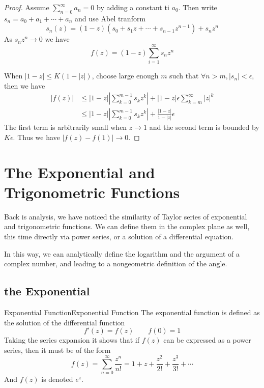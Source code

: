 \documentclass[../main.tex]{subfiles}
\begin{document}
\begin{proof}
Assume $\sum_{n=0}^{\infty } a_n = 0$ by adding a constant ti $a_0$. Then write $s_n = a_0+a_1+\cdots +a_n$ and use Abel tranform
\begin{equation*}
	s_n(z) = (1-z)(s_0+s_1z+\cdots + s_{n-1}z^{n-1}) + s_nz^n
\end{equation*}
As $s_nz^n \rightarrow 0$ we have
\begin{equation*}
f(z) = (1-z) \sum_{i=1}^{\infty } s_nz^n
\end{equation*}

When $\left|1-z\right| \leq K(1-\left|z\right|)$, choose large enough $m$ such that $\forall n>m,\left|s_n\right|<\epsilon$, then we have
\begin{equation*}
\begin{aligned}
	\left|f(z)\right| &\leq \left|1-z\right| \left|\sum_{k=0}^{m-1} s_kz^k\right| + \left|1-z\right| \epsilon \sum_{k=m}^{\infty } \left|z\right|^k\\
			  &\leq \left|1-z\right| \left|\sum_{k=0}^{m-1} s_kz^k\right| + \frac{\left|1-z\right|}{1-\left|z\right|} \epsilon
\end{aligned}
\end{equation*}
The first term is arbitrarily small when $z \rightarrow 1$ and the second term is bounded by $K\epsilon$. Thus we have $\left|f(z)-f(1)\right| \rightarrow 0$.
\end{proof}


\section{The Exponential and Trigonometric Functions}

Back is analysis, we have noticed the similarity of Taylor series of exponential and trigonometric functions. We can define them in the complex plane as well, this time directly via power series, or a solution of a differential equation.

In this way, we can analytically define the logarithm and the argument of a complex number, and leading to a nongeometric definition of the angle.

\subsection{the Exponential}
\begin{definition}{Exponential Function}{Exponential Function}
The exponential function is defined as the solution of the differential function
\begin{equation}
f'(z) = f(z) \qquad f(0) = 1
\end{equation}
Taking the series expansion it shows that if $f(z)$ can be expressed as a power series, then it must be of the form
\begin{equation}
	f(z) = \sum_{n=0}^{\infty } \frac{z^n}{n!} = 1 + z + \frac{z^2}{2!} + \frac{z^3}{3!} + \cdots
\end{equation}
And $f(z)$ is denoted $e^z$.
\end{definition}
\end{document}
